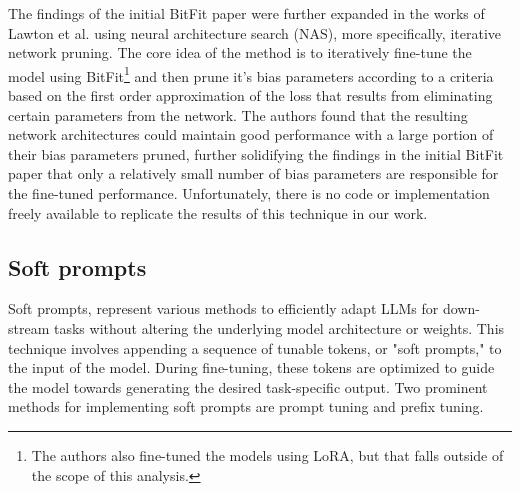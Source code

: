 \documentclass[fleqn,moreauthors,10pt]{ds_report}
\begin{document}
The findings of the initial BitFit paper were further expanded in the works of Lawton et al.\cite{us-bitfit} using neural architecture search (NAS), more specifically, iterative network pruning. The core idea of the method is to iteratively fine-tune the model using BitFit\footnote{The authors also fine-tuned the models using LoRA, but that falls outside of the scope of this analysis.} and then prune it's bias parameters according to a criteria based on the first order approximation of the loss that results from eliminating certain parameters from the network. The authors found that the resulting network architectures could maintain good performance with a large portion of their bias parameters pruned, further solidifying the findings in the initial BitFit paper that only a relatively small number of bias parameters are responsible for the fine-tuned performance. Unfortunately, there is no code or implementation freely available to replicate the results of this technique in our work.

\subsection*{Soft prompts}
Soft prompts, represent various methods to efficiently adapt LLMs for down-stream tasks without altering the underlying model architecture or weights. This technique involves appending a sequence of tunable tokens, or "soft prompts," to the input of the model. During fine-tuning, these tokens are optimized to guide the model towards generating the desired task-specific output. Two prominent methods for implementing soft prompts are prompt tuning and prefix tuning. 
\end{document}

